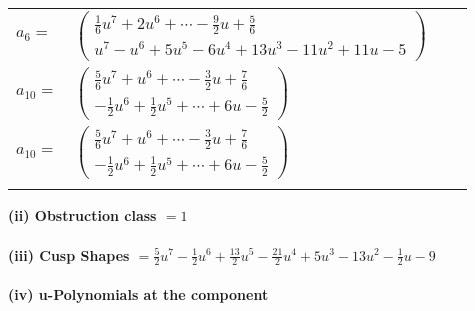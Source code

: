 \documentclass[1p]{elsarticle_modified}
\theoremstyle{definition}
\begin{document}
\begin{tabular}{m{7pt} m{180pt} m{7pt} m{180pt} }
\flushright $a_{6}=$&$\begin{pmatrix}\frac{1}{6} u^7+2 u^6+\cdots-\frac{9}{2} u+\frac{5}{6}\\u^7- u^6+5 u^5-6 u^4+13 u^3-11 u^2+11 u-5\end{pmatrix}$ \\
\flushright $a_{10}=$&$\begin{pmatrix}\frac{5}{6} u^7+u^6+\cdots-\frac{3}{2} u+\frac{7}{6}\\-\frac{1}{2} u^6+\frac{1}{2} u^5+\cdots+6 u-\frac{5}{2}\end{pmatrix}$\\ \flushright $a_{10}=$&$\begin{pmatrix}\frac{5}{6} u^7+u^6+\cdots-\frac{3}{2} u+\frac{7}{6}\\-\frac{1}{2} u^6+\frac{1}{2} u^5+\cdots+6 u-\frac{5}{2}\end{pmatrix}$\\&\end{tabular}
\flushleft \textbf{(ii) Obstruction class $= 1$}\\~\\
\flushleft \textbf{(iii) Cusp Shapes $= \frac{5}{2} u^7-\frac{1}{2} u^6+\frac{13}{2} u^5-\frac{21}{2} u^4+5 u^3-13 u^2-\frac{1}{2} u-9$}\\~\\
\newpage\renewcommand{\arraystretch}{1}
\flushleft \textbf{(iv) u-Polynomials at the component}\newline \\
\end{document}
